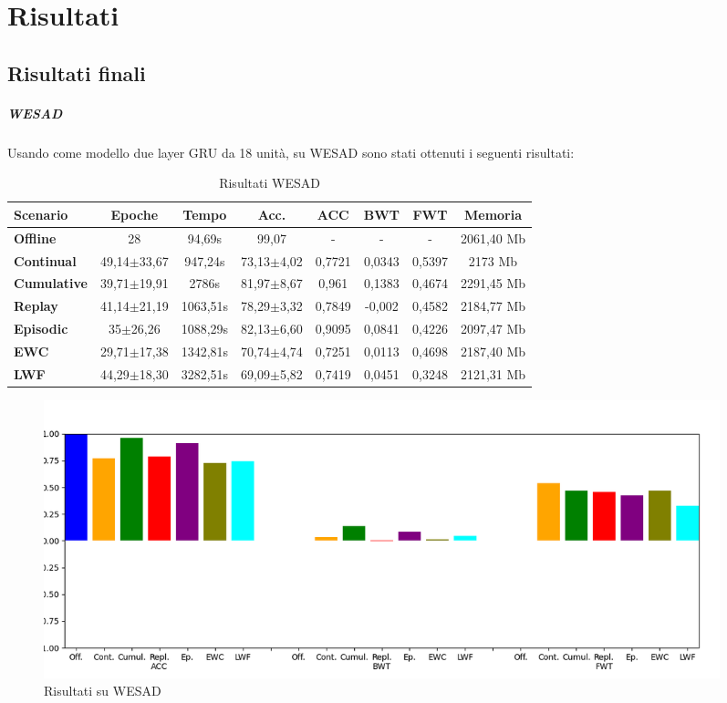 \chapter{Risultati}
\section{Risultati finali}
\paragraph{WESAD} Usando come modello due layer GRU da 18 unità, su WESAD sono stati ottenuti i seguenti risultati:

\begin{table}[h]
\footnotesize
    \begin{tabular}{l|c|c|c|c|c|c|c}
        \textbf{Scenario} & \textbf{Epoche} & \textbf{Tempo} & \textbf{Acc.} & \textbf{ACC} & \textbf{BWT} & \textbf{FWT} & \textbf{Memoria}\\
        \hline
        \textbf{Offline} & 28 & 94,69s & 99,07 & - & - & - & 2061,40 Mb\\
        \textbf{Continual} & 49,14$\pm$33,67 & 947,24s & 73,13$\pm$4,02 & 0,7721 & 0,0343 & 0,5397 & 2173 Mb\\
        \textbf{Cumulative} & 39,71$\pm$19,91 & 2786s & 81,97$\pm$8,67 & 0,961 & 0,1383 & 0,4674 & 2291,45 Mb\\
        \textbf{Replay} & 41,14$\pm$21,19 & 1063,51s & 78,29$\pm$3,32 & 0,7849 & -0,002 & 0,4582 & 2184,77 Mb\\
        \textbf{Episodic} & 35$\pm$26,26 & 1088,29s & 82,13$\pm$6,60 & 0,9095 & 0,0841 & 0,4226 & 2097,47 Mb\\
        \textbf{EWC} & 29,71$\pm$17,38 & 1342,81s & 70,74$\pm$4,74 & 0,7251 & 0,0113 & 0,4698 & 2187,40 Mb\\
        \textbf{LWF} & 44,29$\pm$18,30 & 3282,51s & 69,09$\pm$5,82 & 0,7419 & 0,0451 & 0,3248 & 2121,31 Mb\\
    \end{tabular}
    \caption{Risultati WESAD}
    \label{tab:reswesad}
\end{table}
\begin{figure}[h]
	\begin{center}
		\includegraphics[width=0.95\textwidth]{img/graphs/wesad_final_metrics.png}
		\caption{Risultati su WESAD}
		\label{fig:wesad_metrics_graph}
	\end{center}
\end{figure}

